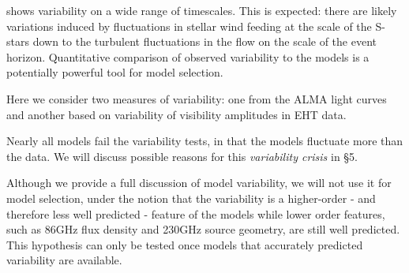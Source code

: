 %


\sgra shows variability on a wide range of timescales.  This is expected: there are likely variations induced by fluctuations in stellar wind feeding at the scale of the S-stars down to the turbulent fluctuations in the flow on the scale of the event horizon.  Quantitative comparison of observed variability to the models is a potentially powerful tool for model selection.

Here we consider two measures of variability: one from the ALMA light curves and another based on variability of visibility amplitudes in EHT data.

Nearly all models fail the variability tests, in that the models fluctuate more than the data.  We will discuss possible reasons for this {\em variability crisis} in \S 5.

Although we provide a full discussion of model variability, we will not use it for model selection, under the notion that the variability is a higher-order - and therefore less well predicted -  feature of the models while lower order features, such as 86GHz flux density and 230GHz source geometry, are still well predicted.  This hypothesis can only be tested once models that accurately predicted variability are available.

